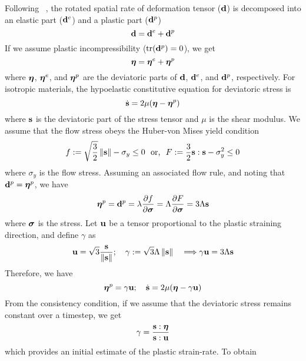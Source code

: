   Following ~\cite{Maudlin1996}, the rotated spatial rate of deformation 
  tensor ($\mathbf{d}$) is decomposed into an elastic part ($\mathbf{d}^e$) and a 
  plastic part ($\mathbf{d}^p$)
  \begin{equation}
     \mathbf{d} = \mathbf{d}^e + \mathbf{d}^p
  \end{equation}
  If we assume plastic incompressibility ($\text{tr}{(\ensuremath{\mathbf{d}}^p)} = 0$), we get
  \begin{equation}
     \boldsymbol{\eta} = \boldsymbol{\eta}^e + \boldsymbol{\eta}^p
  \end{equation}
  where $\boldsymbol{\eta}$, $\boldsymbol{\eta}^e$, and $\boldsymbol{\eta}^p$ are the deviatoric parts of $\mathbf{d}$,
  $\mathbf{d}^e$, and $\mathbf{d}^p$, respectively.  For isotropic materials, the hypoelastic
  constitutive equation for deviatoric stress is
  \begin{equation}
    \dot{\mathbf{s}} = 2\mu(\boldsymbol{\eta} - \boldsymbol{\eta}^p)
  \end{equation}
  where $\mathbf{s}$ is the deviatoric part of the stress tensor and $\mu$ is the
  shear modulus.  We assume that the flow stress obeys the Huber-von Mises
  yield condition
  \begin{equation}
    f := \sqrt{\frac{3}{2}}\left\lVert\mathbf{s}\right\rVert - \sigma_y \le 0  ~~\text{or,}~~
    F := \frac{3}{2} \mathbf{s}:\mathbf{s} - \sigma_y^2 \le 0 
  \end{equation}
  where $\sigma_y$ is the flow stress.  Assuming an associated flow rule,
  and noting that $\mathbf{d}^p = \boldsymbol{\eta}^p$, we have
  \begin{equation}
    \boldsymbol{\eta}^p = \mathbf{d}^p = \lambda\frac{\displaystyle\partial f}{\displaystyle\partial \boldsymbol{\sigma}} 
                    = \Lambda\frac{\displaystyle\partial F}{\displaystyle\partial \boldsymbol{\sigma}} = 3\Lambda\mathbf{s}
  \end{equation}
  where $\boldsymbol{\sigma}$ is the stress.  Let $\mathbf{u}$ be a tensor proportional to the 
  plastic straining direction, and define $\gamma$ as
  \begin{equation}
    \mathbf{u} = \sqrt{3} \frac{\mathbf{s}}{\left\lVert\mathbf{s}\right\rVert}; \quad
    \gamma := \sqrt{3}\Lambda\left\lVert\mathbf{s}\right\rVert  \quad \Longrightarrow
    \gamma\mathbf{u} = 3\Lambda\mathbf{s}
  \end{equation}
  Therefore, we have
  \begin{equation} \label{eq:stresseqn}
    \boldsymbol{\eta}^p = \gamma\mathbf{u}; \quad  
    \dot{\mathbf{s}} = 2\mu(\boldsymbol{\eta} - \gamma\mathbf{u})
  \end{equation}
  From the consistency condition, if we assume that the deviatoric stress
  remains constant over a timestep, we get 
  \begin{equation}
    \gamma = \frac{\mathbf{s}:\boldsymbol{\eta}}{\mathbf{s}:\mathbf{u}}
  \end{equation}
  which provides an initial estimate of the plastic strain-rate.  To obtain
